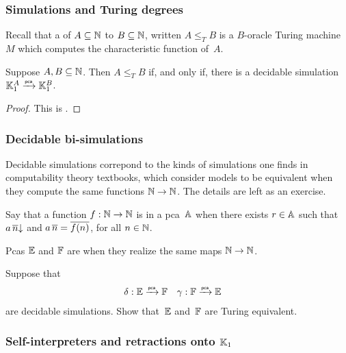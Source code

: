 \subsubsection{Simulations and Turing degrees}
\label{ex:pcamorphism-turing-degrees}%

Recall that a  of $A \subseteq \NN$ to $B \subseteq \NN$, written $A \leq_T B$ is a $B$-oracle Turing machine~$M$ which computes the characteristic function of~$A$.

\begin{theorem}
  Suppose $A, B \subseteq \NN$. Then $A \leq_T B$ if, and only if, there is a decidable simulation $\klone^A \pcato \klone^B$.
\end{theorem}

\begin{proof}
  This is \cite[Proposition 3.1.6]{Longley:94}.
\end{proof}


\subsubsection{Decidable bi-simulations}
\label{sec:decid-bi-simul}

Decidable simulations correpond to the kinds of simulations one finds in computability theory textbooks, which consider models to be equivalent when they compute the same functions $\NN \to \NN$. The details are left as an exercise.

\begin{definition}
  Say that a function $f : \NN \to \NN$ is  in a pca~$\AA$ when there exists $r \in \AA$ such that $\defined{a \, \numeral{n}}$ and $a \, \numeral{n} = \numeral{f(n)}$, for all $n \in \NN$.

  Pcas $\EE$ and $\FF$ are  when they realize the same maps $\NN \to \NN$.
\end{definition}

\begin{exercise}
  Suppose that
  \begin{align*}
    \delta &: \EE \pcato \FF
    &
      \gamma &: \FF \pcato \EE
  \end{align*}
  are decidable simulations. Show that~$\EE$ and~$\FF$ are Turing equivalent.
\end{exercise}


\subsubsection{Self-interpreters and retractions onto $\klone$}
\label{ex:pcamorphism-K1-lambda}%

